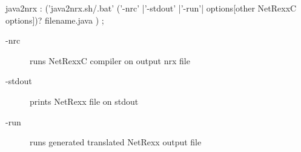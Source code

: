 \begin{rail}
java2nrx : ('java2nrx.sh/.bat' 
                 ('-nrc' |'-stdout' |'-run'| options[other NetRexxC options])? filename.java 
                )
               ;
\end{rail}
\begin{description}
   \item[-nrc]      runs NetRexxC compiler on output nrx file
   \item[-stdout]   prints NetRexx file on stdout
   \item[-run]      runs generated translated NetRexx output file
\end{description}
